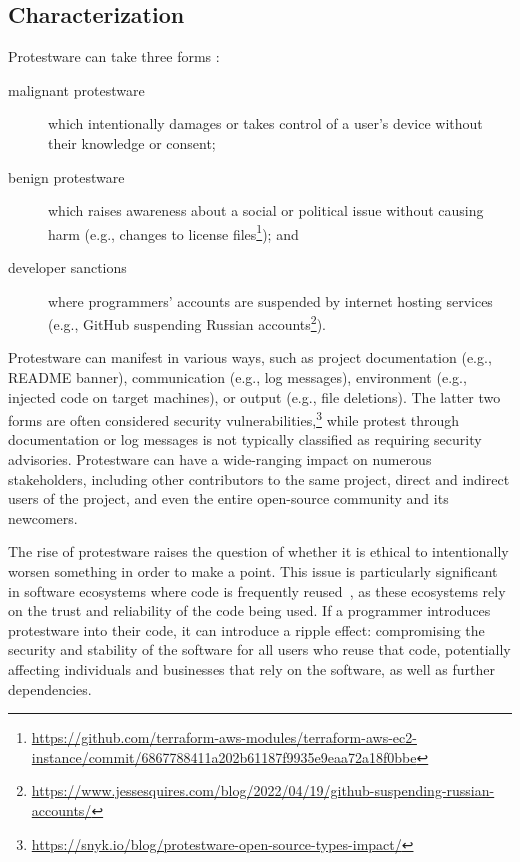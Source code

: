 \documentclass[journal,twocolumn]{IEEEtran}
\begin{document}

\subsection{Characterization}
\label{sec:characterization}
Protestware can take three forms \cite{kula2022war}: 

\begin{description}
\item[malignant protestware] which intentionally damages or takes control of a user's device without their knowledge or consent; 
\item[benign protestware] which raises awareness about a social or political issue without causing harm (e.g., changes to license files\footnote{\url{https://github.com/terraform-aws-modules/terraform-aws-ec2-instance/commit/6867788411a202b61187f9935e9eaa72a18f0bbe}}); and 
\item[developer sanctions] where programmers' accounts are suspended by internet hosting services (e.g., GitHub suspending Russian accounts\footnote{\url{https://www.jessesquires.com/blog/2022/04/19/github-suspending-russian-accounts/}}). 
\end{description}

Protestware can manifest in various ways, such as project documentation (e.g., README banner), communication (e.g., log messages), environment (e.g., injected code on target machines), or output (e.g., file deletions). The latter two forms are often considered security vulnerabilities,\footnote{\url{https://snyk.io/blog/protestware-open-source-types-impact/}} while protest through documentation or log messages is not typically classified as requiring security advisories. Protestware can have a wide-ranging impact on numerous stakeholders, including other contributors to the same project, direct and indirect users of the project, and even the entire open-source community and its newcomers.

The rise of protestware raises the question of whether it is ethical to intentionally worsen something in order to make a point. This issue is particularly significant in software ecosystems where code is frequently reused~\cite{zahan2022weak}, as these ecosystems rely on the trust and reliability of the code being used. If a programmer introduces protestware into their code, it can introduce a ripple effect: compromising the security and stability of the software for all users who reuse that code, potentially affecting individuals and businesses that rely on the software, as well as further dependencies.
\end{document}
